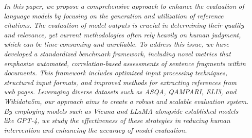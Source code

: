 \textit{In this paper, we propose a comprehensive approach to enhance the evaluation of language models by focusing on the generation and utilization of reference citations. The evaluation of model outputs is crucial in determining their quality and relevance, yet current methodologies often rely heavily on human judgment, which can be time-consuming and unreliable. To address this issue, we have developed a standardized benchmark framework, including novel metrics that emphasize automated, correlation-based assessments of sentence fragments within documents. This framework includes optimized input processing techniques, structured input formats, and improved methods for extracting references from web pages. Leveraging diverse datasets such as ASQA, QAMPARI, ELI5, and Wikidata5m, our approach aims to create a robust and scalable evaluation system. By employing models such as Vicuna and LLaMA alongside established models like GPT-4, we study the effectiveness of these strategies in reducing human intervention and enhancing the accuracy of model evaluation.}